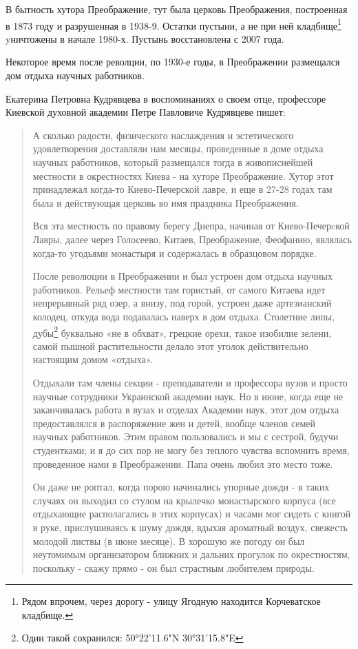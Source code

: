    В бытность хутора Преображение, тут была церковь Преображения, построенная в 1873 году и разрушенная в 1938-9. Остатки пустыни, а не при ней кладбище\footnote{Рядом впрочем, через дорогу - улицу Ягодную находится Корчеватское кладбище.} yничтожены в начале 1980-х. Пустынь восстановлена с 2007 года.

Некоторое время после револции, по 1930-е годы, в Преображении размещался дом отдыха научных работников.

Екатерина Петровна Кудрявцева в воспоминаниях о своем отце, профессоре Киевской духовной академии Петре Павловиче Кудрявцеве пишет:

\begin{quotation}
А сколько радости, физического наслаждения и эстетического удовлетворения доставляли нам месяцы, проведенные в доме отдыха научных работников, который размещался тогда в живописнейшей местности в окрестностях Киева - на хуторе Преображение. Хутор этот принадлежал когда-то Киево-Печерской лавре, и еще в 27-28 годах там была и действующая церковь во имя праздника Преображения.

Вся эта местность по правому берегу Днепра, начиная от Киево-Печер­cкой Лавры, далее через Голосеево, Китаев, Преображение, Феофанию, являлась когда-то угодьями монастыря и содержалась в образцо­вом порядке. 

После революции в Преображении и был устроен дом отдыха научных работников. Рельеф местности там гористый, от са­мого Китаева идет непрерывный ряд озер, а внизу, под горой, устроен даже артезианский колодец, откуда вода подавалась наверх в дом отдыха. Столетние липы, дубы\footnote{Один такой сохранился: 50°22'11.6"N 30°31'15.8"E} буквально «не в обхват», грецкие орехи, такое изобилие зелени, самой пышной растительности делало этот уголок действительно настоящим домом «отдыха».

Отдыхали там члены секции - преподаватели и профессора вузов и просто научные сотрудники Украинской академии наук. Но в июне, когда еще не заканчивалась работа в вузах и отделах Академии наук, этот дом отдыха предоставлял­ся в распоряжение жен и детей, вообще членов семей научных работников. Этим правом пользовались и мы с сестрой, будучи студентками; и я до сих пор не могу без теплого чувства вспомнить время, проведен­ное нами в Преображении. Папа очень любил это место тоже. 

Он даже не роптал, когда порою начинались упорные дожди - в таких случаях он выходил со стулом на крылечко монастырского корпуса (все отды­хающие располагались в этих корпусах) и часами мог сидеть с книгой в руке, прислушиваясь к шуму дождя, вдыхая ароматный воздух, свежесть молодой листвы (в июне месяце). В хорошую же погоду он был
неутомимым организатором ближних и дальних прогулок по окрестно­стям, поскольку - скажу прямо - он был страстным любителем при­роды.
\end{quotation}

